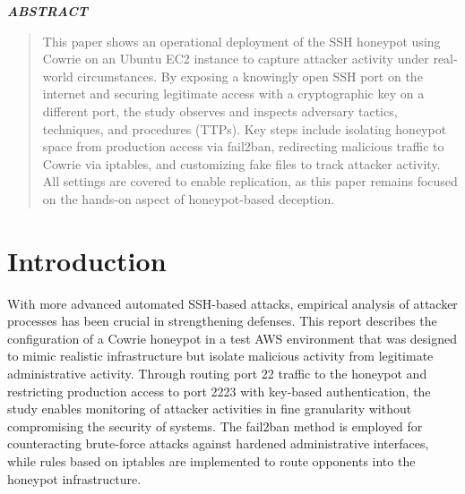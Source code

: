 \documentclass{cls/ULBreport}
\renewenvironment{abstract}{%
  \clearpage
  \thispagestyle{plain}
  \begin{center}
    \bfseries\itshape ABSTRACT
  \end{center}
  \vspace{0.5cm}
  \begin{quote}
    \itshape
    \justifying
}{%
  \end{quote}
  \clearpage
}
\begin{document}
    
    \renewcommand{\rmdefault}{cmr} %
    \renewcommand{\sfdefault}{cmss} %
    \renewcommand{\ttdefault}{cmtt} %
    
    \makeatletter
    \renewcommand{\reset@font}{\normalfont\@setfontsize\f@size{12}{14.4}}
    \makeatother
    \normalfont


    \begin{abstract}        
    This paper shows an operational deployment of the SSH honeypot using Cowrie on an Ubuntu EC2 instance to capture attacker activity under real-world circumstances. By exposing a knowingly open SSH port on the internet and securing legitimate access with a cryptographic key on a different port, the study observes and inspects adversary tactics, techniques, and procedures (TTPs). Key steps include isolating honeypot space from production access via fail2ban, redirecting malicious traffic to Cowrie via iptables, and customizing fake files to track attacker activity. All settings are covered to enable replication, as this paper remains focused on the hands-on aspect of honeypot-based deception. 
    \end{abstract}
    \newpage


    \section{Introduction}
    With more advanced automated SSH-based attacks, empirical analysis of attacker processes has been crucial in strengthening defenses. This report describes the configuration of a Cowrie honeypot in a test AWS environment that was designed to mimic realistic infrastructure but isolate malicious activity from legitimate administrative activity. Through routing port 22 traffic to the honeypot and restricting production access to port 2223 with key-based authentication, the study enables monitoring of attacker activities in fine granularity without compromising the security of systems. The fail2ban method is employed for counteracting brute-force attacks against hardened administrative interfaces, while rules based on iptables are implemented to route opponents into the honeypot infrastructure. 
\end{document}
